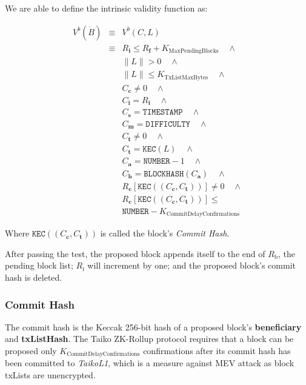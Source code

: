 \documentclass[9pt,oneside]{amsart}
\begin{document}
\begin{multicols}{2}
We are able to define the intrinsic validity function as:

\begin{eqnarray}
V^{b}(\dot{B}) & \equiv &   V^{b}(C,L)  \\
\nonumber & \equiv &   R_\mathbf{i} \le R_\mathbf{f} + K_\mathrm{MaxPendingBlocks}   \quad \wedge \\
\nonumber& & \lVert L \rVert > 0 \quad \wedge \\
\nonumber & & \lVert L \rVert \le K_{\mathrm{TxListMaxBytes}} \quad \wedge \\
\nonumber& & C_{\mathbf{c}} \ne 0   \quad \wedge \\
\nonumber& & C_{\mathbf{i}} = R_\mathbf{i}   \quad \wedge \\
\nonumber& & C_{\mathbf{s}} = \texttt{TIMESTAMP}   \quad \wedge \\
\nonumber& & C_{\mathbf{m}} = \texttt{DIFFICULTY}   \quad \wedge \\
\nonumber& & C_{\mathbf{t}} \ne 0   \quad \wedge \\
\nonumber& & C_{\mathbf{t}} = \texttt{KEC}(L)   \quad \wedge \\
\nonumber& & C_{\mathbf{a}} = \texttt{NUMBER} - 1   \quad \wedge \\
\nonumber& & C_{\mathbf{h}} = \texttt{BLOCKHASH}(C_{\mathbf{a}})   \quad \wedge \\
\nonumber& & R_{\mathbf{c}}[\texttt{KEC}((C_{\mathbf{c}}, C_{\mathbf{t}}))] \ne 0  \quad \wedge \\
\nonumber& & R_{\mathbf{c}}[\texttt{KEC}((C_{\mathbf{c}}, C_{\mathbf{t}}))] \le  \\
\nonumber& &  \texttt{NUMBER}   -  K_{\mathrm{CommitDelayConfirmations}}
\end{eqnarray}

Where $\texttt{KEC}((C_{\mathbf{c}}, C_{\mathbf{t}}))$ is called the block's \textit{Commit Hash}.

After passing the test, the proposed block appends itself to the end of $R_\mathrm{b}$, the pending block list; $R_\mathrm{i}$ will increment by one; and the proposed block's commit hash is deleted.


\subsubsection{Commit Hash} The commit hash is the Keccak 256-bit hash of a proposed block's \textbf{beneficiary} and \textbf{txListHash}. The Taiko ZK-Rollup protocol requires that a block can be proposed only $K_{\mathrm{CommitDelayConfirmations}}$ confirmations after its commit hash has been committed to  \textit{TaikoL1}, which is a measure against MEV attack\cite{mevethfoundation} as block txLists are unencrypted.


\end{multicols}
\end{document}
